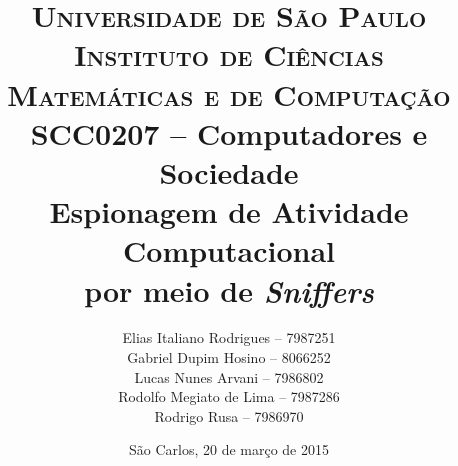 \begin{titlepage}

		\title{
\textsc {\large{Universidade de São Paulo\\
Instituto de Ciências Matemáticas e de Computação}}\\[1cm]
\large{SCC0207 -- Computadores e Sociedade}\\[6cm]
\LARGE{Espionagem de Atividade Computacional\\ por meio de \textit{Sniffers}}\\[5.5cm]
		}

		\author{
Elias Italiano Rodrigues -- 7987251\\
Gabriel Dupim Hosino -- 8066252\\
Lucas Nunes Arvani -- 7986802\\
Rodolfo Megiato de Lima -- 7987286\\
Rodrigo Rusa -- 7986970
		}

		\date{
\vfill São Carlos, 20 de março de 2015
		}

		\maketitle
		\thispagestyle{empty}

\end{titlepage}
